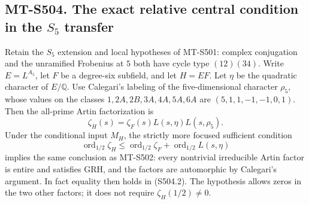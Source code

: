 \subsection*{MT-S504. The exact relative central condition in the $S_5$ transfer}

Retain the $S_5$ extension and local hypotheses of MT-S501:
complex conjugation and the unramified Frobenius at $5$ both
have cycle type $(12)(34)$. Write $E=L^{A_5}$, let $F$
be a degree-six subfield, and let $H=EF$. Let $\eta$ be the
quadratic character of $E/\mathbb Q$. Use Calegari's labeling
of the five-dimensional character $\rho_5$, whose values on
the classes $1,2A,2B,3A,4A,5A,6A$ are
$(5,1,1,-1,-1,0,1)$. Then the all-prime Artin factorization is
\[
       \zeta_H(s)=\zeta_F(s)L(s,\eta)L(s,\rho_5).
 \tag{S504.1}
\]
Under the conditional input $M_H$, the strictly more focused
sufficient condition
\[
 \operatorname{ord}_{1/2}\zeta_H
       \le\operatorname{ord}_{1/2}\zeta_F
                     +\operatorname{ord}_{1/2}L(s,\eta)
 \tag{S504.2}
\]
implies the same conclusion as MT-S502: every nontrivial
irreducible Artin factor is entire and satisfies GRH, and
the factors are automorphic by Calegari's argument.
In fact equality then holds in (S504.2). The hypothesis
allows zeros in the two other factors; it does not require
$\zeta_H(1/2)\ne0$.

